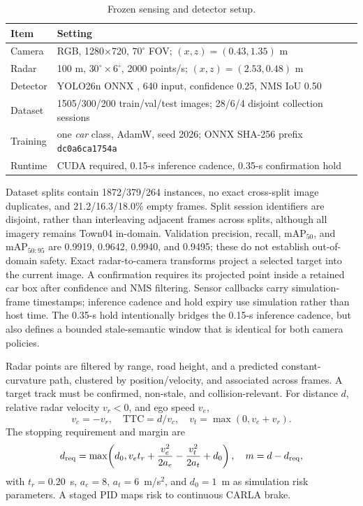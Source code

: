 \documentclass[conference]{IEEEtran}
\begin{document}
\begin{table}[t]
\caption{Frozen sensing and detector setup.}
\label{tab:setup}
\centering\scriptsize
\setlength{\tabcolsep}{3pt}
\begin{tabular}{p{}p{}}
\toprule Item & Setting\\ \midrule
Camera & RGB, 1280$\times$720, $70^\circ$ FOV; $(x,z)=(0.43,1.35)$ m\\
Radar & 100 m, $30^\circ\!\times6^\circ$, 2000 points/s; $(x,z)=(2.53,0.48)$ m\\
Detector & YOLO26n ONNX \cite{ultralytics_yolo}, 640 input, confidence 0.25, NMS IoU 0.50\\
Dataset & 1505/300/200 train/val/test images; 28/6/4 disjoint collection sessions\\
Training & one \emph{car} class, AdamW, seed 2026; ONNX SHA-256 prefix \texttt{dc0a6ca1754a}\\
Runtime & CUDA required, 0.15-s inference cadence, 0.35-s confirmation hold\\
\bottomrule
\end{tabular}
\end{table}

Dataset splits contain 1872/379/264 instances, no exact cross-split image
duplicates, and 21.2/16.3/18.0\% empty frames. Split session identifiers are
disjoint, rather than interleaving adjacent frames across splits, although all
imagery remains Town04 in-domain. Validation precision, recall,
$\mathrm{mAP}_{50}$, and $\mathrm{mAP}_{50:95}$ are 0.9919, 0.9642, 0.9940,
and 0.9495; these do not establish out-of-domain safety. Exact radar-to-camera
transforms project a selected target into the current image. A confirmation
requires its projected point inside a retained car box after confidence and NMS
filtering. Sensor callbacks carry simulation-frame timestamps; inference cadence
and hold expiry use simulation rather than host time. The 0.35-s hold intentionally
bridges the 0.15-s inference cadence, but also defines a bounded stale-semantic
window that is identical for both camera policies.

Radar points are filtered by range, road height, and a predicted
constant-curvature path, clustered by position/velocity, and associated across
frames. A target track must be confirmed, non-stale, and collision-relevant.
For distance $d$, relative radar velocity $v_r<0$, and ego speed $v_e$,
\begin{equation}
 v_c=-v_r,\quad \mathrm{TTC}=d/v_c,\quad v_t=\max(0,v_e+v_r).
\end{equation}
The stopping requirement and margin are
\begin{equation}
 d_{\rm req}=\max\!\left(d_0,v_et_r+\frac{v_e^2}{2a_e}-
 \frac{v_t^2}{2a_t}+d_0\right),\quad m=d-d_{\rm req},
\end{equation}
with $t_r=0.20$~s, $a_e=8$, $a_t=6$~m/s$^2$, and $d_0=1$~m as simulation
risk parameters. A staged PID maps risk to continuous CARLA brake.
\end{document}
